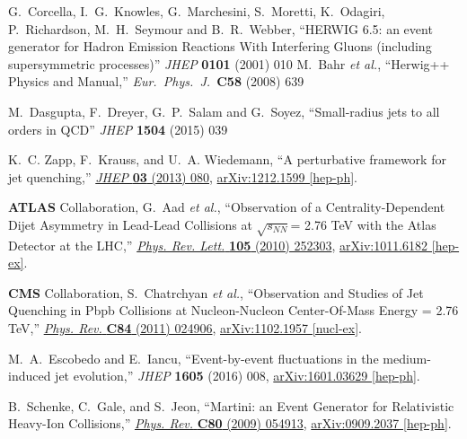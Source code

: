 \documentclass[a4paper,12pt]{article}
\numberwithin{equation}{section}
\begin{document}
\begin{thebibliography}{10}
  G.~Corcella, I.~G.~Knowles, G.~Marchesini, S.~Moretti, K.~Odagiri, P.~Richardson, M.~H.~Seymour and B.~R.~Webber,
  ``HERWIG 6.5: an event generator for Hadron Emission Reactions With Interfering Gluons (including supersymmetric processes)'' {\it JHEP} {\bf 0101} (2001) 010 %
  M.~Bahr {\it et al.},
  ``Herwig++ Physics and Manual,''
  {\it Eur.\ Phys.\ J.\ }{\bf C58} (2008) 639




  M.~Dasgupta, F.~Dreyer, G.~P.~Salam and G.~Soyez, ``Small-radius jets to all orders in QCD''
  {\it JHEP} {\bf 1504} (2015) 039



K.~C. Zapp, F.~Krauss, and U.~A. Wiedemann, ``{A perturbative framework for jet
  quenching},'' \href{http://dx.doi.org/10.1007/JHEP03(2013)080}{{\em JHEP}
  {\bfseries 03} (2013) 080},
\href{http://arxiv.org/abs/1212.1599}{{\ttfamily arXiv:1212.1599 [hep-ph]}}.



{\bfseries ATLAS} Collaboration, G.~Aad {\em et al.}, ``{Observation of a
  Centrality-Dependent Dijet Asymmetry in Lead-Lead Collisions at
  $\sqrt{s_{NN}}$= 2.76 TeV with the Atlas Detector at the LHC},''
  \href{http://dx.doi.org/10.1103/PhysRevLett.105.252303}{{\em Phys. Rev.
  Lett.} {\bfseries 105} (2010) 252303},
\href{http://arxiv.org/abs/1011.6182}{{\ttfamily arXiv:1011.6182 [hep-ex]}}.

{\bfseries CMS} Collaboration, S.~Chatrchyan {\em et al.}, ``{Observation and
  Studies of Jet Quenching in Pbpb Collisions at Nucleon-Nucleon Center-Of-Mass
  Energy = 2.76 TeV},''
  \href{http://dx.doi.org/10.1103/PhysRevC.84.024906}{{\em Phys. Rev.}
  {\bfseries C84} (2011) 024906},
\href{http://arxiv.org/abs/1102.1957}{{\ttfamily arXiv:1102.1957 [nucl-ex]}}.



  M.~A.~Escobedo and E.~Iancu,
  ``Event-by-event fluctuations in the medium-induced jet evolution,''
  {\em JHEP} {\bf 1605}  (2016) 008,
  \href{http://arxiv.org/abs/1601.03629}{{\ttfamily  arXiv:1601.03629 [hep-ph]}}.
  
B.~Schenke, C.~Gale, and S.~Jeon, ``{Martini: an Event Generator for
  Relativistic Heavy-Ion Collisions},''
  \href{http://dx.doi.org/10.1103/PhysRevC.80.054913}{{\em Phys. Rev.}
  {\bfseries C80} (2009) 054913},
\href{http://arxiv.org/abs/0909.2037}{{\ttfamily arXiv:0909.2037 [hep-ph]}}.


\end{thebibliography}
\end{document}
